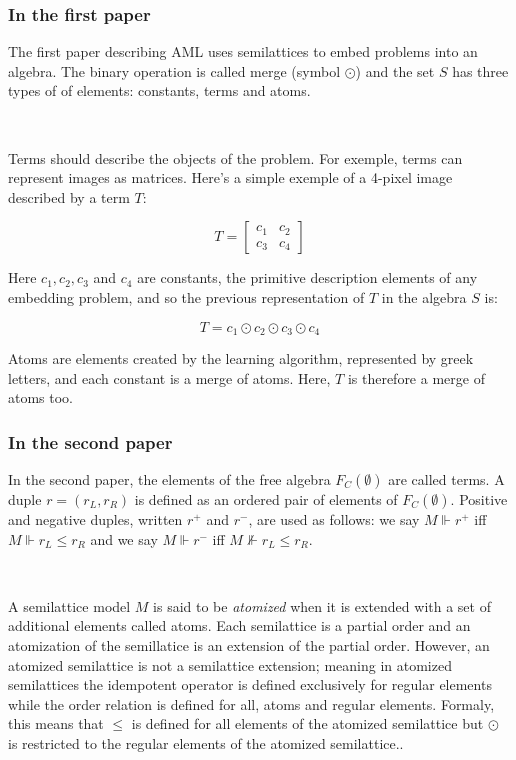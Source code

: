 \documentclass[a4paper, 11pt]{article}
\begin{document}
\subsubsection{In the first paper}

The first paper describing AML uses semilattices to embed problems into an algebra. The binary operation is called merge (symbol $\odot$) and the set $S$ has three types of of elements: constants, terms and atoms.

\

Terms should describe the objects of the problem. For exemple, terms can represent images as matrices. Here's a simple exemple of a 4-pixel image described by a term $T$:

\begin{equation*}
    T = \begin{bmatrix}
    c_1 & c_2 \\
    c_3 & c_4
    \end{bmatrix}
\end{equation*}

Here $c_1, c_2, c_3$ and $c_4$ are constants, the primitive description elements of any embedding problem, and so the previous representation of $T$ in the algebra $S$ is:

\begin{equation*}
    T = c_1 \odot c_2 \odot c_3 \odot c_4
\end{equation*}

Atoms are elements created by the learning algorithm, represented by greek letters, and each constant is a merge of atoms. Here, $T$ is therefore a merge of atoms too.

\subsubsection{In the second paper}

In the second paper, the elements of the free algebra $F_C(\emptyset)$ are called terms. A duple $r = (r_L, r_R)$ is defined as an ordered pair of elements of $F_C(\emptyset)$. Positive and negative duples, written $r^+$ and $r^-$, are used as follows: we say $M \Vdash r^+$ iff $M \Vdash r_L \leq r_R$ and we say $M \Vdash r^-$ iff $M \not\Vdash r_L \leq r_R$. 

\

A semilattice model $M$ is said to be \textit{atomized} when it is extended with a set of additional elements called atoms. Each semilattice is a partial order and an atomization of the semillatice is an extension of the partial order. However, an atomized semilattice is not a semilattice extension; meaning in atomized semilattices the idempotent operator is defined exclusively for regular elements while the order relation is defined for all, atoms and regular elements. 
Formaly, this means that $\leq$ is defined for all elements of the atomized semilattice but $\odot$ is restricted to the regular elements of the atomized semilattice..
\end{document}

